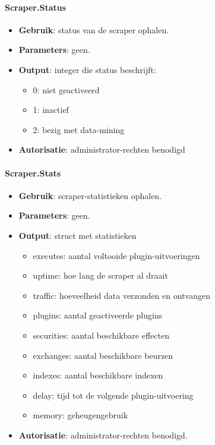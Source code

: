 \paragraph{Scraper.Status}
\begin{itemize}
\item{\textbf{Gebruik}: status van de scraper ophalen.}
\item{\textbf{Parameters}: geen.}
\item{\textbf{Output}: integer die status beschrijft:}
	\begin{itemize}
	\item{0: niet geactiveerd}
	\item{1: inactief}
	\item{2: bezig met data-mining}
	\end{itemize}
\item{\textbf{Autorisatie}: administrator-rechten benodigd}
\end{itemize}

\paragraph{Scraper.Stats}
\begin{itemize}
\item{\textbf{Gebruik}: scraper-statistieken ophalen.}
\item{\textbf{Parameters}: geen.}
\item{\textbf{Output}: struct met statistieken}
	\begin{itemize}
	\item{executes: aantal voltooide plugin-uitvoeringen}
	\item{uptime: hoe lang de scraper al draait}
	\item{traffic: hoeveelheid data verzonden en ontvangen}
	\item{plugins: aantal geactiveerde plugins}
	\item{securities: aantal beschikbare effecten}
	\item{exchanges: aantal beschikbare beurzen}
	\item{indexes: aantal beschikbare indexen}
	\item{delay: tijd tot de volgende plugin-uitvoering}
	\item{memory: geheugengebruik}
	\end{itemize}
\item{\textbf{Autorisatie}: administrator-rechten benodigd.}
\end{itemize}

